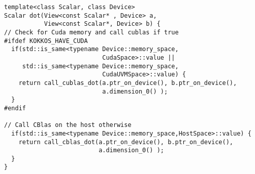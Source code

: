 \begin{lstlisting}
template<class Scalar, class Device>
Scalar dot(View<const Scalar* , Device> a, 
           View<const Scalar*, Device> b) {
// Check for Cuda memory and call cublas if true
#ifdef KOKKOS_HAVE_CUDA
  if(std::is_same<typename Device::memory_space,
                           CudaSpace>::value ||
     std::is_same<typename Device::memory_space,
                           CudaUVMSpace>::value) {
    return call_cublas_dot(a.ptr_on_device(), b.ptr_on_device(),
                           a.dimension_0() );
  }
#endif

// Call CBlas on the host otherwise
  if(std::is_same<typename Device::memory_space,HostSpace>::value) {
    return call_cblas_dot(a.ptr_on_device(), b.ptr_on_device(),
                          a.dimension_0() );
  }
}
\end{lstlisting}

